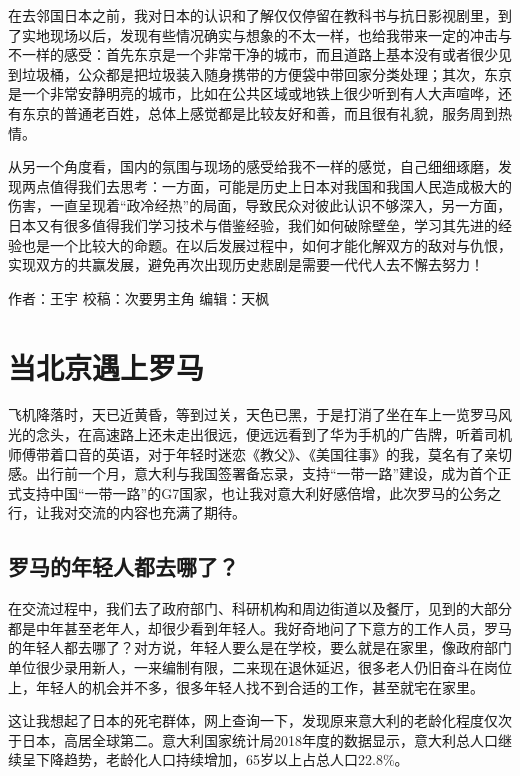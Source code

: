 \documentclass[
]{book}
\begin{document}
在去邻国日本之前，我对日本的认识和了解仅仅停留在教科书与抗日影视剧里，到了实地现场以后，发现有些情况确实与想象的不太一样，也给我带来一定的冲击与不一样的感受：首先东京是一个非常干净的城市，而且道路上基本没有或者很少见到垃圾桶，公众都是把垃圾装入随身携带的方便袋中带回家分类处理；其次，东京是一个非常安静明亮的城市，比如在公共区域或地铁上很少听到有人大声喧哗，还有东京的普通老百姓，总体上感觉都是比较友好和善，而且很有礼貌，服务周到热情。

从另一个角度看，国内的氛围与现场的感受给我不一样的感觉，自己细细琢磨，发现两点值得我们去思考：一方面，可能是历史上日本对我国和我国人民造成极大的伤害，一直呈现着``政冷经热''的局面，导致民众对彼此认识不够深入，另一方面，日本又有很多值得我们学习技术与借鉴经验，我们如何破除壁垒，学习其先进的经验也是一个比较大的命题。在以后发展过程中，如何才能化解双方的敌对与仇恨，实现双方的共赢发展，避免再次出现历史悲剧是需要一代代人去不懈去努力！

作者：王宇
校稿：次要男主角
编辑：天枫

\hypertarget{ux5f53ux5317ux4eacux9047ux4e0aux7f57ux9a6c}{%
\section{当北京遇上罗马}\label{ux5f53ux5317ux4eacux9047ux4e0aux7f57ux9a6c}}

飞机降落时，天已近黄昏，等到过关，天色已黑，于是打消了坐在车上一览罗马风光的念头，在高速路上还未走出很远，便远远看到了华为手机的广告牌，听着司机师傅带着口音的英语，对于年轻时迷恋《教父》、《美国往事》的我，莫名有了亲切感。出行前一个月，意大利与我国签署备忘录，支持``一带一路''建设，成为首个正式支持中国``一带一路''的G7国家，也让我对意大利好感倍增，此次罗马的公务之行，让我对交流的内容也充满了期待。

\hypertarget{ux7f57ux9a6cux7684ux5e74ux8f7bux4ebaux90fdux53bbux54eaux4e86}{%
\subsection{罗马的年轻人都去哪了？}\label{ux7f57ux9a6cux7684ux5e74ux8f7bux4ebaux90fdux53bbux54eaux4e86}}

在交流过程中，我们去了政府部门、科研机构和周边街道以及餐厅，见到的大部分都是中年甚至老年人，却很少看到年轻人。我好奇地问了下意方的工作人员，罗马的年轻人都去哪了？对方说，年轻人要么是在学校，要么就是在家里，像政府部门单位很少录用新人，一来编制有限，二来现在退休延迟，很多老人仍旧奋斗在岗位上，年轻人的机会并不多，很多年轻人找不到合适的工作，甚至就宅在家里。

这让我想起了日本的死宅群体，网上查询一下，发现原来意大利的老龄化程度仅次于日本，高居全球第二。意大利国家统计局2018年度的数据显示，意大利总人口继续呈下降趋势，老龄化人口持续增加，65岁以上占总人口22.8\%。
\end{document}
